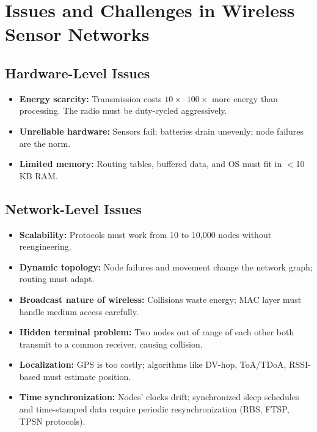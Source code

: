 \documentclass[12pt,a4paper]{article}
\begin{document}
\section{Issues and Challenges in Wireless Sensor Networks}

\subsection{Hardware-Level Issues}
\begin{itemize}[leftmargin=*, itemsep=3pt]
  \item \textbf{Energy scarcity:} Transmission costs $10\times$--$100\times$ more energy than processing. The radio must be duty-cycled aggressively.
  \item \textbf{Unreliable hardware:} Sensors fail; batteries drain unevenly; node failures are the norm.
  \item \textbf{Limited memory:} Routing tables, buffered data, and OS must fit in $<$10 KB RAM.
\end{itemize}

\subsection{Network-Level Issues}
\begin{itemize}[leftmargin=*, itemsep=3pt]
  \item \textbf{Scalability:} Protocols must work from 10 to 10,000 nodes without reengineering.
  \item \textbf{Dynamic topology:} Node failures and movement change the network graph; routing must adapt.
  \item \textbf{Broadcast nature of wireless:} Collisions waste energy; MAC layer must handle medium access carefully.
  \item \textbf{Hidden terminal problem:} Two nodes out of range of each other both transmit to a common receiver, causing collision.
  \item \textbf{Localization:} GPS is too costly; algorithms like DV-hop, ToA/TDoA, RSSI-based must estimate position.
  \item \textbf{Time synchronization:} Nodes' clocks drift; synchronized sleep schedules and time-stamped data require periodic resynchronization (RBS, FTSP, TPSN protocols).
\end{itemize}
\end{document}
